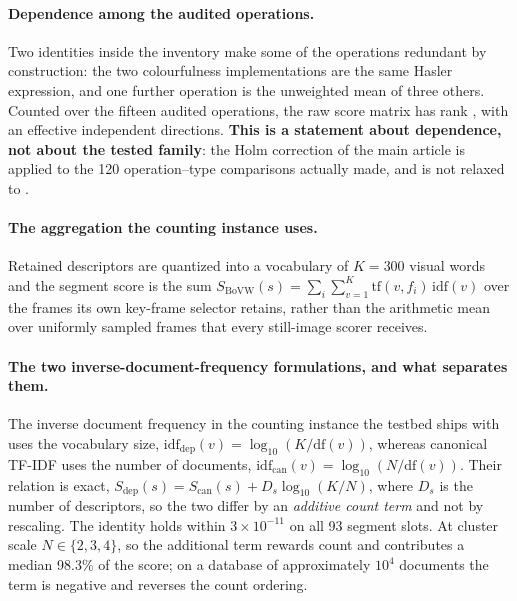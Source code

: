 \documentclass[sn-basic,Numbered]{sn-jnl}
\begin{document}
\clearpage


\clearpage


\clearpage


\paragraph{Dependence among the audited operations.} Two identities inside the inventory
make some of the operations redundant by construction: the two colourfulness
implementations are the same Hasler expression, and one further operation is the unweighted
mean of three others. Counted over the fifteen audited operations, the raw score matrix has
rank \effPosto{}, with an effective \effMeff{} independent directions. \textbf{This is a
statement about dependence, not about the tested family}: the Holm correction of the main
article is applied to the 120 operation--type comparisons actually made, and is not relaxed
to \effMeff{}.


\paragraph{The aggregation the counting instance uses.} Retained descriptors are quantized
into a vocabulary of $K=300$ visual words and the segment score is the sum
$S_{\mathrm{BoVW}}(s)=\sum_i\sum_{v=1}^{K}\mathrm{tf}(v,f_i)\,\mathrm{idf}(v)$ over the
frames its own key-frame selector retains, rather than the arithmetic mean over uniformly
sampled frames that every still-image scorer receives.

\paragraph{The two inverse-document-frequency formulations, and what separates them.}
The inverse document frequency in the counting instance the testbed ships with uses the
vocabulary size, $\mathrm{idf}_{\mathrm{dep}}(v)=\log_{10}(K/\mathrm{df}(v))$, whereas
canonical TF-IDF uses the number of documents,
$\mathrm{idf}_{\mathrm{can}}(v)=\log_{10}(N/\mathrm{df}(v))$. Their relation is exact,
$S_{\mathrm{dep}}(s)=S_{\mathrm{can}}(s)+D_s\log_{10}(K/N)$, where $D_s$ is the number of
descriptors, so the two differ by an \emph{additive count term} and not by rescaling. The
identity holds within $3\times10^{-11}$ on all 93 segment slots. At cluster scale
$N\in\{2,3,4\}$, so the additional term rewards count and contributes a median 98.3\% of
the score; on a database of approximately $10^4$ documents the term is negative and
reverses the count ordering.
\end{document}
